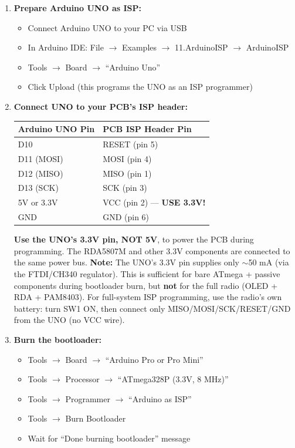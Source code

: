 \documentclass[a4paper,11pt]{article}
\renewcommand*{\,}{ }%
\begin{document}
\begin{enumerate}
    \item \textbf{Prepare Arduino UNO as ISP:}
    \begin{itemize}[noitemsep]
        \item Connect Arduino UNO to your PC via USB
        \item In Arduino IDE: File $\rightarrow$ Examples $\rightarrow$ 11.ArduinoISP $\rightarrow$ ArduinoISP
        \item Tools $\rightarrow$ Board $\rightarrow$ ``Arduino Uno''
        \item Click Upload (this programs the UNO as an ISP programmer)
    \end{itemize}
    
    \item \textbf{Connect UNO to your PCB's ISP header:}
    
    \begin{tabular}{ll}
    \toprule
    \textbf{Arduino UNO Pin} & \textbf{PCB ISP Header Pin} \\
    \midrule
    D10 & RESET (pin 5) \\
    D11 (MOSI) & MOSI (pin 4) \\
    D12 (MISO) & MISO (pin 1) \\
    D13 (SCK) & SCK (pin 3) \\
    5V or 3.3V & VCC (pin 2) --- \textbf{USE 3.3V!} \\
    GND & GND (pin 6) \\
    \bottomrule
    \end{tabular}
    
    \begin{warningbox}
    \textbf{Use the UNO's 3.3V pin, NOT 5V}, to power the PCB during programming. The RDA5807M and other 3.3V components are connected to the same power bus. \textbf{Note:} The UNO's 3.3V pin supplies only $\sim$50\,mA (via the FTDI/CH340 regulator). This is sufficient for bare ATmega + passive components during bootloader burn, but \textbf{not} for the full radio (OLED + RDA + PAM8403). For full-system ISP programming, use the radio's own battery: turn SW1 ON, then connect only MISO/MOSI/SCK/RESET/GND from the UNO (no VCC wire).
    \end{warningbox}
    
    \item \textbf{Burn the bootloader:}
    \begin{itemize}[noitemsep]
        \item Tools $\rightarrow$ Board $\rightarrow$ ``Arduino Pro or Pro Mini''
        \item Tools $\rightarrow$ Processor $\rightarrow$ ``ATmega328P (3.3V, 8 MHz)''
        \item Tools $\rightarrow$ Programmer $\rightarrow$ ``Arduino as ISP''
        \item Tools $\rightarrow$ Burn Bootloader
        \item Wait for ``Done burning bootloader'' message
    \end{itemize}
\end{enumerate}
\end{document}
